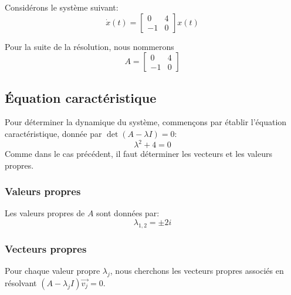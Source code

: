         Considérons le système suivant:
        \begin{equation}
            \dot{x}(t)=\begin{bmatrix} 0 & 4 \\ -1 & 0 \end{bmatrix} x(t)
        \end{equation}

        Pour la suite de la résolution, nous nommerons
        \begin{equation}
            A=\begin{bmatrix} 0 & 4 \\ -1 & 0 \end{bmatrix}
        \end{equation}
    
        \subsection{Équation caractéristique}  
            Pour déterminer la dynamique du système, commençons par établir l'équation caractéristique, donnée par $\det (A - \lambda I)=0$:
            \begin{equation}
                \lambda^2 + 4=0
            \end{equation}
            Comme dans le cas précédent, il faut déterminer les vecteurs et les valeurs propres.
        
            \subsubsection{Valeurs propres}  
                Les valeurs propres de $A$ sont données par:
                \begin{equation}
                    \lambda_{1,2}=\pm 2i
                \end{equation}
            
            \subsubsection{Vecteurs propres}  
                Pour chaque valeur propre $\lambda_j$, nous cherchons les vecteurs propres associés en résolvant $(A - \lambda_j I)\overrightarrow{v_j}=0$.
                
